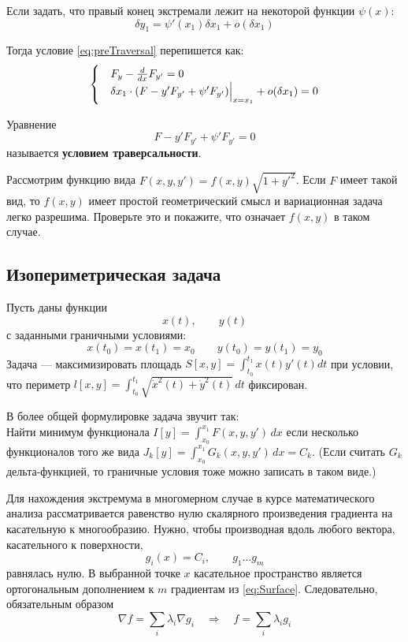\documentclass[12pt]{article}
\begin{document}

	Если задать, что правый конец экстремали лежит на некоторой функции $\psi(x)$:
	$$\delta y_1 = \psi'(x_1) \delta x_1 + o(\delta x_1)$$

	Тогда условие \ref{eq:preTraversal} перепишется как:
	$$
	\begin{cases}
		&F_y - \frac{d}{dx} F_{y'} = 0 \\
		&\delta x_1 \cdot (F - y'F_{y'} + \psi' F_{y'})\Big|_{x=x_1}^{} + o(\delta x_1) = 0
	\end{cases} 
	$$

	Уравнение
	$$F - y' F_{y'} + \psi' F_{y'} = 0$$
	называется \textbf{условием траверсальности}.

	\exc Рассмотрим функцию вида $F(x, y, y') = f(x,y) \sqrt{1+y'^2}$. Если $F$ имеет такой вид, то $f(x,y)$ имеет простой 
	геометрический смысл и вариационная задача легко разрешима. Проверьте это и покажите, что означает $f(x,y)$ в таком
	случае.

	\subsection{Изопериметрическая задача}
	Пусть даны функции 
	$$x(t),\qquad y(t)$$
	с заданными граничными условиями:
	$$x(t_0) = x(t_1) = x_0 \qquad y(t_0) = y(t_1) = y_0$$
	Задача --- максимизировать площадь $S[x,y] = \int_{t_0}^{t_1}x(t)y'(t) dt$ при условии, что периметр
	$l[x,y] = \int_{t_0}^{t_1} \sqrt{\dot{x}^2(t) + \dot{y}^2(t)}\,dt$ фиксирован.

	В более общей формулировке задача звучит так: \\
	Найти минимум функционала $I[y] = \int_{x_0}^{x_1} F(x,y,y')\,dx$ если несколько функционалов того же вида
	$J_k[y] = \int_{x_0}^{x_1} G_k(x,y,y')\,dx = C_k$. (Если считать $G_k$ дельта-функцией, то граничные условия
	тоже можно записать в таком виде.)

	Для нахождения экстремума в многомерном случае в курсе математического анализа рассматривается равенство
	нулю скалярного произведения градиента на касательную к многообразию.
	Нужно, чтобы производная вдоль любого вектора, касательного к поверхности, 
	\begin{equation}g_i(x) = C_i, \qquad g_1\ldots g_m \label{eq:Surface}\end{equation}
	равнялась нулю. В выбранной точке $x$ касательное пространство является ортогональным дополнением
	к $m$ градиентам из \ref{eq:Surface}. Следовательно, обязательным образом
	$$\nabla f = \sum_i \lambda_i \nabla g_i \quad \Rightarrow \quad f = \sum_i \lambda_i g_i$$
\end{document}
